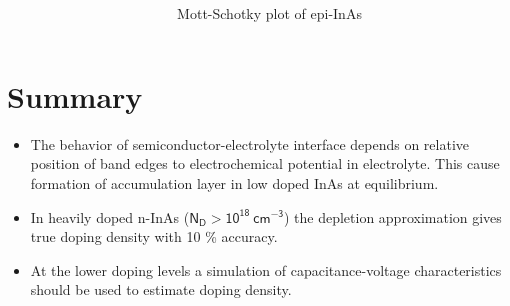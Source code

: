 \documentclass[final, xcolor=cmyk]{beamer}
\newcommand{\figfont}{\normalsize} %
\begin{document}
\begin{poster}
\begin{columns}[c]
        \begin{column}{0.005\columnwidth}
        \end{column}   
                   
        \begin{column}{\figwidth}
             \vspace{1ex} 
             \centering
             \figfont
             
             \vspace*{1ex}
             \caption{\hskip50pt Mott-Schotky plot of epi-InAs}  
        \end{column}
\end{columns}	


\section{Summary} \justifying
    \begin{itemize} \itemsep12pt
        \justifying
        \item The behavior of semiconductor-electrolyte interface depends on relative position of  band edges to electrochemical potential in electrolyte. This cause formation of accumulation layer in low doped InAs at equilibrium.
        \item     In heavily doped n-InAs ($\mathsf{N_D > 10^{18}\ cm^{-3}}$)  the depletion approximation gives true doping density with 10  \% accuracy.
        \item At the lower doping levels a simulation of capacitance-voltage characteristics should be used         to estimate doping density.
    \end{itemize}


\end{poster}
\end{document}
